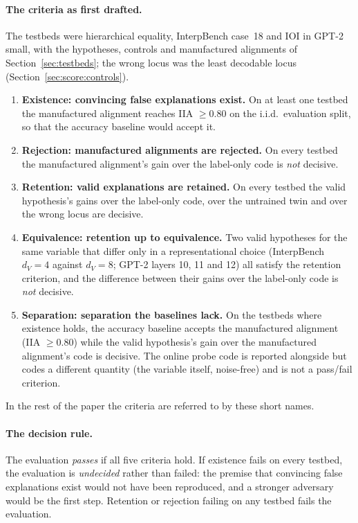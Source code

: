\documentclass[11pt,a4paper]{article}
\newcommand{\dv}{d_V}
\begin{document}
\paragraph{The criteria as first drafted.} The testbeds were hierarchical equality, InterpBench case~18 and IOI in GPT-2 small, with the hypotheses, controls and manufactured alignments of Section~\ref{sec:testbeds}; the wrong locus was the least decodable locus (Section~\ref{sec:score:controls}).
\begin{enumerate}
\item \textbf{Existence: convincing false explanations exist.} On at least one testbed the manufactured alignment reaches IIA $\ge0.80$ on the i.i.d.\ evaluation split, so that the accuracy baseline would accept it.
\item \textbf{Rejection: manufactured alignments are rejected.} On every testbed the manufactured alignment's gain over the label-only code is \emph{not} decisive.
\item \textbf{Retention: valid explanations are retained.} On every testbed the valid hypothesis's gains over the label-only code, over the untrained twin and over the wrong locus are decisive.
\item \textbf{Equivalence: retention up to equivalence.} Two valid hypotheses for the same variable that differ only in a representational choice (InterpBench $\dv=4$ against $\dv=8$; GPT-2 layers 10, 11 and 12) all satisfy the retention criterion, and the difference between their gains over the label-only code is \emph{not} decisive.
\item \textbf{Separation: separation the baselines lack.} On the testbeds where existence holds, the accuracy baseline accepts the manufactured alignment (IIA $\ge0.80$) while the valid hypothesis's gain over the manufactured alignment's code is decisive. The online probe code is reported alongside but codes a different quantity (the variable itself, noise-free) and is not a pass/fail criterion.
\end{enumerate}
In the rest of the paper the criteria are referred to by these short names.

\paragraph{The decision rule.} The evaluation \emph{passes} if all five criteria hold. If existence fails on every testbed, the evaluation is \emph{undecided} rather than failed: the premise that convincing false explanations exist would not have been reproduced, and a stronger adversary would be the first step. Retention or rejection failing on any testbed fails the evaluation.
\end{document}
